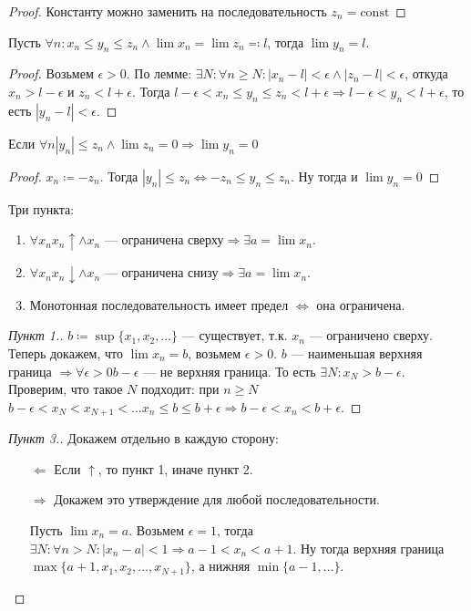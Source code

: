  \begin{proof}
     Константу можно заменить на последовательность $z_n = \text{const}$
\end{proof}
\begin{theorem}
    Пусть $\forall n: x_n \le y_n \le z_n \land \lim x_n = \lim z_n \eqqcolon l$, тогда $\lim y_n = l$.
\end{theorem}
\begin{proof}
    Возьмем $\epsilon > 0$. По лемме:  $\exists N: \forall n \ge N: |x_n-l| < \epsilon \land |z_n-l| < \epsilon$, откуда $x_n > l - \epsilon$ и  $z_n < l + \epsilon$. Тогда  $l - \epsilon < x_n \le y_n \le z_n < l + \epsilon \Rightarrow l - \epsilon < y_n < l + \epsilon$, то есть $|y_n - l| < \epsilon$.
\end{proof}
\begin{consequence}
     Если $\forall n |y_n| \le z_n \land \lim z_n = 0 \Rightarrow \lim y_n = 0$
\end{consequence}
\begin{proof}
    $x_n \coloneqq -z_n$. Тогда  $|y_n| \le z_n \iff -z_n \le y_n \le z_n$. Ну тогда и $\lim y_n = 0$
\end{proof}
\begin{theorem}
    Три пункта:
    \begin{enumerate}
        \item $\forall x_n x_n \uparrow \land x_n\text{ --- ограничена сверху} \Rightarrow \exists a = \lim x_n$.
        \item $\forall x_n x_n \downarrow \land x_n\text{ --- ограничена снизу} \Rightarrow \exists a = \lim x_n$. 
        \item Монотонная последовательность имеет предел $\iff$ она ограничена.
    \end{enumerate}
\end{theorem}
\begin{proof}[Пункт 1.]
    $b \coloneqq \sup \{x_1,x_2,\ldots\}$ --- существует, т.к. $x_n$ --- ограничено сверху. Теперь докажем, что  $\lim x_n = b$, возьмем  $\epsilon > 0$. $b$ --- наименьшая верхняя граница  $\Rightarrow \forall \epsilon > 0 b - \epsilon$ --- не верхняя граница. То есть  $\exists N: x_N > b - \epsilon$. Проверим, что такое  $N$ подходит: при  $n \ge N$ $b - \epsilon < x_N < x_{N+1} < \ldots x_n \le b \le b + \epsilon \Rightarrow b - \epsilon < x_n < b + \epsilon$.
\end{proof}
\begin{proof}[Пункт 3.]
    Докажем отдельно в каждую сторону:
    \begin{itemize}
        \item[$\Leftarrow$]Если $\uparrow$, то пункт 1, иначе  пункт 2.
        \item[$\Rightarrow$]Докажем это утверждение для любой последовательности.

            Пусть $\lim x_n = a$. Возьмем  $\epsilon = 1$, тогда  $\exists N: \forall n > N: |x_n-a| < 1 \Rightarrow a-1<x_n<a+1$. Ну тогда верхняя граница $\max\{a+1,x_1,x_2,\ldots, x_{N+1}\}$, а нижняя $\min\{a-1,\ldots\}$.
    \end{itemize}
\end{proof}
